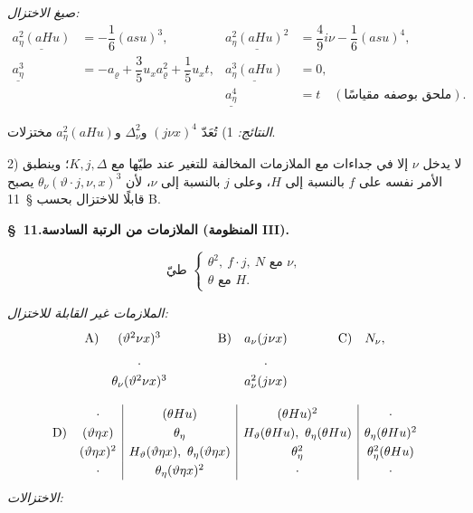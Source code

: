 \documentclass[11pt]{article}
\providecommand{\A}{\Delta}
\providecommand{\R}{\varrho}
\begin{document}
\noindent\emph{صيغ الاختزال:}
\[
\tag{11}
\begin{array}{rl|rl}
\underline{a_\eta^2(aHu)}&=-\dfrac16(asu)^3,&
\underline{a_\eta^2(aHu)^2}&=\dfrac49 i \nu-\dfrac16(asu)^4,\\[0.7em]
\underline{a_\eta^3}&=-a_\R+\dfrac35u_xa_\R^2+\dfrac15u_xt,
&\underline{a_\eta^3(aHu)}&=0,\\[0.7em]
&&\underline{a_\eta^4}&=t\quad(\text{ملحق بوصفه مقياسًا}).
\end{array}
\]

\noindent\emph{النتائج:}
1) تُعَدّ $(j\nu x)^4$ و$\A_\nu^2$ و$a_\eta^2(aHu)$ مختزلات.

2) لا يدخل $\nu$ إلا في جداءات مع الملازمات المخالفة للتغير عند طيّها مع $K,j,\A$؛ وينطبق الأمر نفسه على $f$ بالنسبة إلى $H$، وعلى $j$ بالنسبة إلى $\nu$، لأن $\theta_\nu(\vartheta\cdot j,\nu,x)^3$ يصبح قابلًا للاختزال بحسب \S\ 11 B.

\begin{center}
\textbf{\S\ 11.\quad الملازمات من الرتبة السادسة (المنظومة III).}
\end{center}
\[
\text{طيّ }\left\{\begin{array}{l}
\theta^2,\ f\cdot j,\ N \text{ مع }\nu,\\
\theta\text{ مع }H.
\end{array}\right.
\]


\noindent\emph{الملازمات غير القابلة للاختزال:}
\[
\renewcommand{\arraystretch}{1.25}
\begin{array}{@{}r@{\quad}c@{\qquad\qquad}r@{\quad}c@{\qquad\qquad}r@{\quad}c@{}}
\text{A)}&(\vartheta^2\nu x)^3&\text{B)}&a_\nu(j\nu x)&\text{C)}&N_\nu,\\[0.45em]
&\cdot&&\cdot&&\\[-0.1em]
&\theta_\nu(\vartheta^2\nu x)^3&&a_\nu^2(j\nu x)&&
\end{array}
\]

\[
\renewcommand{\arraystretch}{1.25}
\begin{array}{@{}r@{\quad}c|c|c|c@{}}
&\cdot&(\theta Hu)&(\theta Hu)^2&\cdot\\
\text{D)}&(\vartheta\eta x)&\theta_\eta&H_\vartheta(\theta Hu),\ \theta_\eta(\theta Hu)&\theta_\eta(\theta Hu)^2\\
&(\vartheta\eta x)^2&H_\vartheta(\vartheta\eta x),\ \theta_\eta(\vartheta\eta x)&\theta_\eta^2&\theta_\eta^2(\theta Hu)\\
&\cdot&\theta_\eta(\vartheta\eta x)^2&\cdot&\cdot
\end{array}
\]
\noindent\emph{الاختزالات:}
\end{document}
